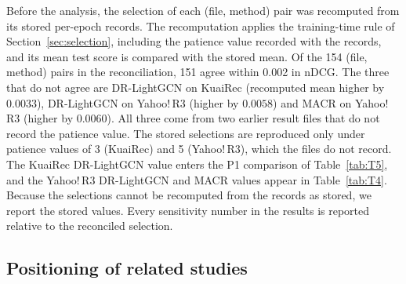 Before the analysis, the selection of each (file, method) pair was recomputed from its stored per-epoch records. The
recomputation applies the training-time rule of Section~\ref{sec:selection}, including the patience value recorded
with the records, and its mean test score is compared with the stored mean. Of the 154 (file, method) pairs in the
reconciliation, 151 agree within 0.002 in nDCG. The three that do not agree are DR-LightGCN on KuaiRec (recomputed mean
higher by $0.0033$), DR-LightGCN on Yahoo!\,R3 (higher by $0.0058$) and MACR on Yahoo!\,R3 (higher by $0.0060$). All
three come from two earlier result files that do not record the patience value. The stored selections are reproduced
only under patience values of 3 (KuaiRec) and 5 (Yahoo!\,R3), which the files do not record. The KuaiRec DR-LightGCN
value enters the P1 comparison of Table~\ref{tab:T5}, and the Yahoo!\,R3 DR-LightGCN and MACR values appear in
Table~\ref{tab:T4}. Because the selections cannot be recomputed from the records as stored, we report the stored
values. Every sensitivity number in the results is reported relative to the reconciled selection.


\subsection{Positioning of related studies}\label{sec:positioning}

